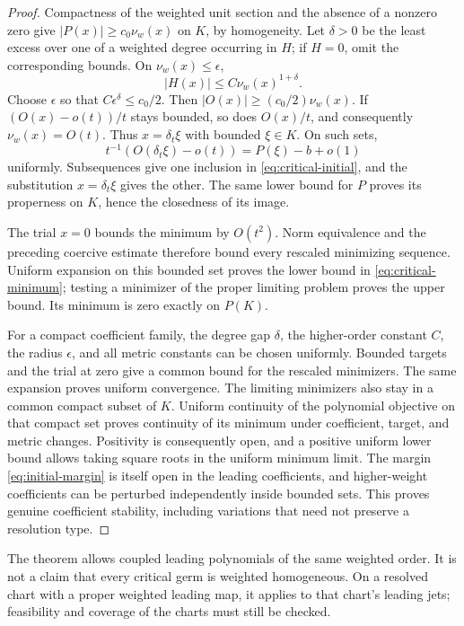 \begin{proof}
Compactness of the weighted unit section and the absence of a nonzero zero give $|P(x)|\ge c_0\nu_w(x)$ on $K$, by homogeneity. Let $\delta>0$ be the least excess over one of a weighted degree occurring in $H$; if $H=0$, omit the corresponding bounds. On $\nu_w(x)\le\epsilon$,
\[
 |H(x)|\le C\nu_w(x)^{1+\delta}.
\]
Choose $\epsilon$ so that $C\epsilon^\delta\le c_0/2$. Then $|O(x)|\ge(c_0/2)\nu_w(x)$. If $(O(x)-o(t))/t$ stays bounded, so does $O(x)/t$, and consequently $\nu_w(x)=O(t)$. Thus $x=\delta_t\xi$ with bounded $\xi\in K$. On such sets,
\[
 t^{-1}(O(\delta_t\xi)-o(t))=P(\xi)-b+o(1)
\]
uniformly. Subsequences give one inclusion in \eqref{eq:critical-initial}, and the substitution $x=\delta_t\xi$ gives the other. The same lower bound for $P$ proves its properness on $K$, hence the closedness of its image.

The trial $x=0$ bounds the minimum by $O(t^2)$. Norm equivalence and the preceding coercive estimate therefore bound every rescaled minimizing sequence. Uniform expansion on this bounded set proves the lower bound in \eqref{eq:critical-minimum}; testing a minimizer of the proper limiting problem proves the upper bound. Its minimum is zero exactly on $P(K)$.

For a compact coefficient family, the degree gap $\delta$, the higher-order constant $C$, the radius $\epsilon$, and all metric constants can be chosen uniformly. Bounded targets and the trial at zero give a common bound for the rescaled minimizers. The same expansion proves uniform convergence. The limiting minimizers also stay in a common compact subset of $K$. Uniform continuity of the polynomial objective on that compact set proves continuity of its minimum under coefficient, target, and metric changes. Positivity is consequently open, and a positive uniform lower bound allows taking square roots in the uniform minimum limit. The margin \eqref{eq:initial-margin} is itself open in the leading coefficients, and higher-weight coefficients can be perturbed independently inside bounded sets. This proves genuine coefficient stability, including variations that need not preserve a resolution type.
\end{proof}

The theorem allows coupled leading polynomials of the same weighted order. It is not a claim that every critical germ is weighted homogeneous. On a resolved chart with a proper weighted leading map, it applies to that chart's leading jets; feasibility and coverage of the charts must still be checked.

